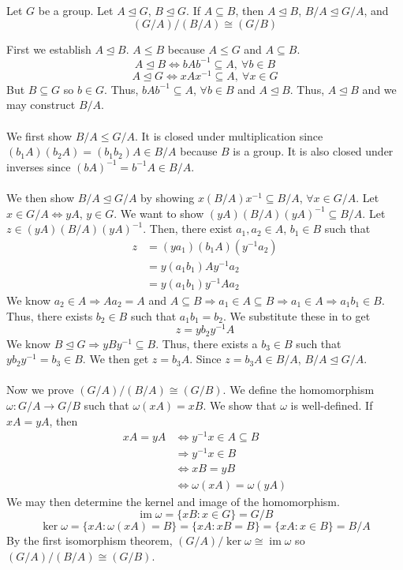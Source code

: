 \documentclass{mathnotes}
\DeclareMathOperator{\im}{im}
\begin{document}
\begin{bthm}
  Let $G$ be a group. Let $A\unlhd G$, $B\unlhd G$. If $A\subseteq B$, then
  $A\unlhd B$, $B/A\unlhd G/A$, and $$(G/A)/(B/A)\cong(G/B)$$
\end{bthm}

\begin{bpf}
  First we establish $A\unlhd B$. $A\le B$ because $A\le G$ and $A\subseteq B$.
  $$A\unlhd B\Leftrightarrow bAb^{-1}\subseteq A,\ \forall b\in B$$
  $$A\unlhd G\Leftrightarrow xAx^{-1}\subseteq A,\ \forall x\in G$$
  But $B\subseteq G$ so $b\in G$. Thus, $bAb^{-1}\subseteq A$, $\forall b\in B$
  and $A\unlhd B$. Thus, $A\unlhd B$ and we may construct $B/A$.\\\\
  We first show $B/A\le G/A$. It is closed under multiplication since
  $(b_1A)(b_2A)=(b_1b_2)A\in B/A$ because $B$ is a group. It is also closed
  under inverses since $(bA)^{-1}=b^{-1}A\in B/A$.\\\\
  We then show $B/A\unlhd G/A$ by showing $x(B/A)x^{-1}\subseteq B/A$, $\forall
  x\in G/A$. Let $x\in G/A\Leftrightarrow yA$, $y\in G$. We want to show
  $(yA)(B/A)(yA)^{-1}\subseteq B/A$. Let $z\in(yA)(B/A)(yA)^{-1}$. Then, there
  exist $a_1,a_2\in A$, $b_1\in B$ such that
  \begin{align*}
    z&=(ya_1)(b_1A)(y^{-1}a_2)\\
     &=y(a_1b_1)Ay^{-1}a_2\\
     &=y(a_1b_1)y^{-1}Aa_2
  \end{align*}
  We know $a_2\in A\Rightarrow Aa_2=A$ and $A\subseteq B\Rightarrow a_1\in
  A\subseteq B\Rightarrow a_1\in A\Rightarrow a_1b_1\in B$. Thus, there exists
  $b_2\in B$ such that $a_1b_1=b_2$. We substitute these in to get
  $$z=yb_2y^{-1}A$$
  We know $B\unlhd G\Rightarrow yBy^{-1}\subseteq B$. Thus, there exists a
  $b_3\in B$ such that $yb_2y^{-1}=b_3\in B$. We then get $z=b_3A$. Since
  $z=b_3A\in B/A$, $B/A\unlhd G/A$.\\\\
  Now we prove $(G/A)/(B/A)\cong(G/B)$. We define the homomorphism
  $\omega:G/A\to G/B$ such that $\omega(xA)=xB$. We show that $\omega$ is
  well-defined. If $xA=yA$, then
  \begin{align*}
    xA=yA&\Leftrightarrow y^{-1}x\in A\subseteq B\\
         &\Rightarrow y^{-1}x\in B\\
         &\Leftrightarrow xB=yB\\
         &\Leftrightarrow\omega(xA)=\omega(yA)
  \end{align*}
  We may then determine the kernel and image of the homomorphism.
  $$\im\omega=\{xB:x\in G\}=G/B$$
  $$\ker\omega=\{xA:\omega(xA)=B\}=\{xA:xB=B\}=\{xA:x\in B\}=B/A$$
  By the first isomorphism theorem, $(G/A)/\ker\omega\cong\im\omega$ so
  $(G/A)/(B/A)\cong(G/B)$.
\end{bpf}
\end{document}
